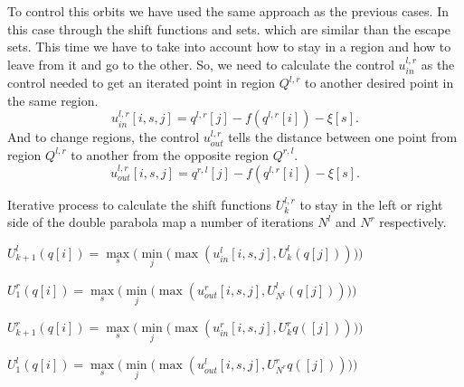 To control this orbits we have used the same approach as the previous cases. In this case through the shift functions and sets. which are similar than the escape sets. This time we have to take into account how to stay in a region and how to leave from it and go to the other. So, we need to calculate the control $u_{in}^{l,r}$ as the control needed to get an iterated point in region $Q^{l,r}$ to another desired point in the same region.
\begin{equation*}
u_{in}^{l,r}[i,s,j] =  q^{l,r}[j] - f(q^{l,r}[i]) - \xi[s].
\end{equation*}
And to change regions, the control $u_{out}^{l,r}$ tells the distance between one point from region $Q^{l,r}$ to another from the opposite region $Q^{r,l}$.
\begin{equation*}
u_{out}^{l,r}[i,s,j] = q^{r,l}[j] - f(q^{l,r}[i]) - \xi[s].
\end{equation*}



\begin{algorithm}[h!]
    \caption{Iterative process to calculate the shift functions $U^{l,r}_{k}$ to stay in the left or right side of the double parabola map a number of iterations $N^l$ and $N^r$ respectively.} 
    \label{alg:ShiftFunction}
\renewcommand{\thealgorithm}{}

\begin{algorithmic}[0]
    

          \State  $U^{l}_{k+1}(q[i])=\max\limits_s\Big(\min\limits_j\big(\max(u_{in}^l[i,s,j],U^l_k(q[j]))\big)\Big)$

        \EndFor
    
       \State   $U^{r}_{1}(q[i])=\max\limits_s\Big(\min\limits_j\big(\max(u_{out}^r[i,s,j],U^l_{N^l}(q[j]))\big)\Big)$   
        
        
            \State  $U^{r}_{k+1}(q[i])=\max\limits_s\Big(\min\limits_j\big(\max(u_{in}^r[i,s,j],U^r_kq([j]))\big)\Big)$
            
        \EndFor
        
        \State  $U^{l}_{1}(q[i])=\max\limits_s\Big(\min\limits_j\big(\max(u_{out}^l[i,s,j],U^r_{N^r}q([j]))\big)\Big)$
    \EndWhile
    \end{algorithmic}
\end{algorithm}









